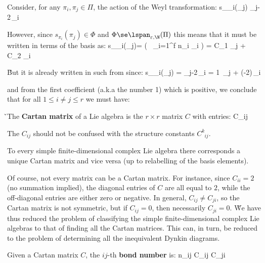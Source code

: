 Consider, for any $\pi_i,\pi_j\in \Pi$, the action of the Weyl transformation:
\bse
s_{\pi_i}(\pi_j) \coloneqq \pi_j-2\,\pi_i
\ese

However, since $s_{\pi_i}(\pi_j)\in\Phi$ and $\Phi\se\lspan_{\varepsilon,\N} (\Pi)$ this means that it must be
written in terms of the basis as:
\bse
s_{\pi_i}(\pi_j)\in\Phi = \left( \varepsilon \, \sum_{i=1}^f n_i \pi_i \right ) = C_1 \pi_j + C_2 \pi_i
\ese

\v

But it is already written in such from since:
\bse
s_{\pi_i}(\pi_j) = \pi_j-2\,\pi_i = 1\, \pi_j
+ \left(-2\right)\,\pi_i
\ese

and from the first coefficient (a.k.a the number 1) which is positive, we conclude that for all $1\leq i\neq j\leq r$
we must have:
\in \N
\ese

\v

The \textbf{Cartan matrix} of a Lie algebra is the $r\times r$ matrix $C$ with entries:
\bse
C_{ij} 
\ese
\ed

\vspace{2pt}

The $C_{ij}$ should not be confused with the structure constants $C^k_{\phantom{k}ij}$.

\bt[]
To every simple finite-dimensional complex Lie algebra there corresponds a unique Cartan matrix and vice versa (up to
relabelling of the basis elements).
\et

Of course, not every matrix can be a Cartan matrix. For instance, since $C_{ii}=2$ (no summation implied), the
diagonal entries of $C$ are all equal to $2$, while the off-diagonal entries are either zero or negative. In general,
$C_{ij} \neq C_{ji}$, so the Cartan matrix is not symmetric, but if $C_{ij}=0$, then necessarily $C_{ji}=0$. \v

We have thus reduced the problem of classifying the simple finite-dimensional complex Lie algebras to that of finding
all the Cartan matrices. This can, in turn, be reduced to the problem of determining all the inequivalent Dynkin
diagrams.

Given a Cartan matrix $C$, the $ij$-th \textbf{bond number} is:
\bse
n_{ij} \coloneqq C_{ij} C_{ji}
\ese
\ed

